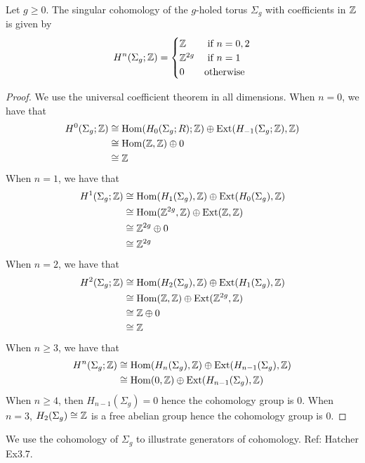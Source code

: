 \documentclass[a4paper]{article}
\begin{document}
\begin{thm}{}{} Let $g\geq 0$. The singular cohomology of the $g$-holed torus $\Sigma_g$ with coefficients in $\mathbb{Z}$ is given by $$H^n(\Sigma_g;\mathbb{Z})=\begin{cases}
\mathbb{Z} & \text{ if } n=0,2\\
\mathbb{Z}^{2g} & \text{ if } n=1\\
0 & \text{otherwise}
\end{cases}$$ \tcbline
\begin{proof}
We use the universal coefficient theorem in all dimensions. 
When $n=0$, we have that 
\begin{align*}
H^0(\Sigma_g;\mathbb{Z})&\cong\operatorname{Hom}(H_0(\Sigma_g;R);\mathbb{Z})\oplus\text{Ext}(H_{-1}(\Sigma_g;\mathbb{Z}),\mathbb{Z})\\
&\cong\operatorname{Hom}(\mathbb{Z},\mathbb{Z})\oplus 0\\
&\cong\mathbb{Z}
\end{align*}
When $n=1$, we have that 
\begin{align*}
H^1(\Sigma_g;\mathbb{Z})&\cong\operatorname{Hom}(H_1(\Sigma_g),\mathbb{Z})\oplus\text{Ext}(H_0(\Sigma_g),\mathbb{Z})\\
&\cong\operatorname{Hom}(\mathbb{Z}^{2g},\mathbb{Z})\oplus\text{Ext}(\mathbb{Z},\mathbb{Z})\\
&\cong\mathbb{Z}^{2g}\oplus 0\\
&\cong\mathbb{Z}^{2g}
\end{align*}
When $n=2$, we have that 
\begin{align*}
H^2(\Sigma_g;\mathbb{Z})&\cong\operatorname{Hom}(H_2(\Sigma_g),\mathbb{Z})\oplus\text{Ext}(H_1(\Sigma_g),\mathbb{Z})\\
&\cong\operatorname{Hom}(\mathbb{Z},\mathbb{Z})\oplus\text{Ext}(\mathbb{Z}^{2g},\mathbb{Z})\\
&\cong\mathbb{Z}\oplus 0\\
&\cong\mathbb{Z}
\end{align*}
When $n\geq 3$, we have that 
\begin{align*}
H^n(\Sigma_g;\mathbb{Z})&\cong\operatorname{Hom}(H_n(\Sigma_g),\mathbb{Z})\oplus\text{Ext}(H_{n-1}(\Sigma_g),\mathbb{Z})\\
&\cong\operatorname{Hom}(0,\mathbb{Z})\oplus\text{Ext}(H_{n-1}(\Sigma_g),\mathbb{Z})
\end{align*}
When $n\geq 4$, then $H_{n-1}(\Sigma_g)=0$ hence the cohomology group is $0$. When $n=3$, $H_2(\Sigma_g)\cong\mathbb{Z}$ is a free abelian group hence the cohomology group is $0$. 
\end{proof}
\end{thm}

We use the cohomology of $\Sigma_g$ to illustrate generators of cohomology. Ref: Hatcher Ex3.7. 
\end{document}
